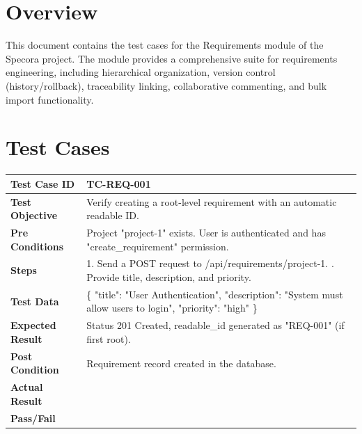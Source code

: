 \section{Overview}
This document contains the test cases for the Requirements module of the Specora project. The module provides a comprehensive suite for requirements engineering, including hierarchical organization, version control (history/rollback), traceability linking, collaborative commenting, and bulk import functionality.

\section{Test Cases}

\begin{longtable}{|p{}|p{}|}
\hline
\textbf{Test Case ID} & TC-REQ-001 \\ \hline
\textbf{Test Objective} & Verify creating a root-level requirement with an automatic readable ID. \\ \hline
\textbf{Pre Conditions} & Project "project-1" exists. User is authenticated and has "create_requirement" permission. \\ \hline
\textbf{Steps} & 
1. Send a POST request to /api/requirements/project-1. \newline
2. Provide title, description, and priority. \\ \hline
\textbf{Test Data} & \{ "title": "User Authentication", "description": "System must allow users to login", "priority": "high" \} \\ \hline
\textbf{Expected Result} & Status 201 Created, readable\_id generated as "REQ-001" (if first root). \\ \hline
\textbf{Post Condition} & Requirement record created in the database. \\ \hline
\textbf{Actual Result} &  \\ \hline
\textbf{Pass/Fail} &  \\ \hline
\end{longtable}

